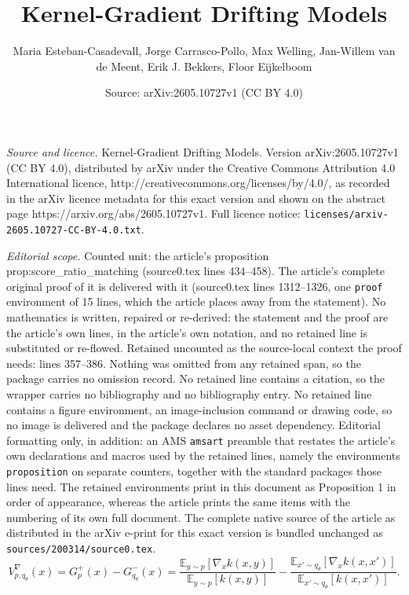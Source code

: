\documentclass[10pt,a4paper]{amsart}
\title{Kernel-Gradient Drifting Models}
\author{Maria Esteban-Casadevall, Jorge Carrasco-Pollo, Max Welling, Jan-Willem van de Meent, Erik J. Bekkers, Floor Eijkelboom}
\date{Source: arXiv:2605.10727v1 (CC BY 4.0)}
\begin{document}
\maketitle

\noindent\emph{Source and licence.} Kernel-Gradient Drifting Models. Version arXiv:2605.10727v1 (CC BY 4.0), distributed by arXiv under the Creative Commons Attribution 4.0 International licence, http://creativecommons.org/licenses/by/4.0/, as recorded in the arXiv licence metadata for this exact version and shown on the abstract page https://arxiv.org/abs/2605.10727v1. Full licence notice: \texttt{licenses/arxiv-2605.10727-CC-BY-4.0.txt}.\par\smallskip

\noindent\textit{Editorial scope.} Counted unit: the article's proposition prop:score\_ratio\_matching (source0.tex lines 434--458). The article's complete original proof of it is delivered with it (source0.tex lines 1312--1326, one \texttt{proof} environment of 15 lines, which the article places away from the statement). No mathematics is written, repaired or re-derived: the statement and the proof are the article's own lines, in the article's own notation, and no retained line is substituted or re-flowed.  Retained uncounted as the source-local context the proof needs: lines 357--386.  Nothing was omitted from any retained span, so the package carries no omission record.  No retained line contains a citation, so the wrapper carries no bibliography and no bibliography entry.  No retained line contains a figure environment, an image-inclusion command or drawing code, so no image is delivered and the package declares no asset dependency.  Editorial formatting only, in addition: an AMS \texttt{amsart} preamble that restates the article's own declarations and macros used by the retained lines, namely the environments \texttt{proposition} on separate counters, together with the standard packages those lines need.  The retained environments print in this document as Proposition 1 in order of appearance, whereas the article prints the same items with the numbering of its own full document.  The complete native source of the article as distributed in the arXiv e-print for this exact version is bundled unchanged as \texttt{sources/200314/source0.tex}.
\begin{equation}
\label{eq:gradient_drifting}
V^\nabla_{p,q_\theta}(x)
=
G_{p}^+(x) - G_{q_\theta}^-(x)
=
\frac{
\mathbb{E}_{y \sim p}
\!\left[
\nabla_x k(x,y)
\right]
}{
\mathbb{E}_{y \sim p}
\!\left[
k(x,y)
\right]
}
-
\frac{
\mathbb{E}_{x' \sim q_\theta}
\!\left[
\nabla_x k(x,x')
\right]
}{
\mathbb{E}_{x' \sim q_\theta}
\!\left[
k(x,x')
\right]
}.
\end{equation}
\end{document}
